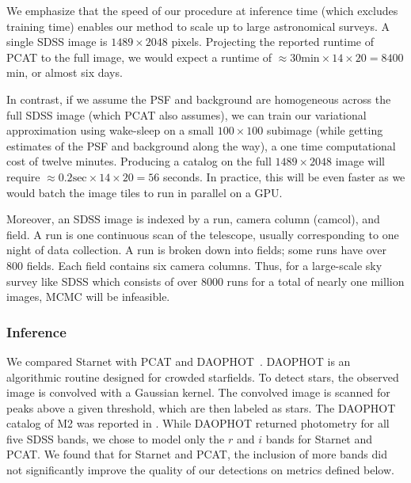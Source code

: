 We emphasize that the speed of our procedure at inference time (which excludes training time) enables our method to scale up to large astronomical surveys. A single SDSS image is $1489 \times 2048$ pixels. Projecting the reported runtime of PCAT to the full image, 
we would expect a runtime of 
$\approx 30\text{min} \times 14 \times 20 = 8400$min, or almost six days. 

In contrast, if we assume the PSF and background are homogeneous 
across the full SDSS image (which PCAT also assumes), we can 
train our variational approximation using wake-sleep 
on a small $100 \times 100$ subimage
(while getting estimates of the PSF and background along the way),
a one time computational cost of twelve minutes. 
Producing a catalog on the full $1489 \times 2048$ image will require 
$\approx 0.2\text{sec} \times 14 \times 20 = 56$ seconds. In practice, 
this will be even faster as we would batch the image tiles to run in parallel on a GPU. 

Moreover, an SDSS image is indexed by a run, camera column (camcol), and field.
A run is one continuous scan of the telescope, usually corresponding to one night of data collection. 
A run is broken down into fields; some runs have over 800 fields. 
Each field contains six camera columns. 
Thus, for a large-scale sky survey like SDSS which 
consists of over 8000 runs for a total of nearly one million images, MCMC will be infeasible. 


\subsubsection{Inference}
\label{sec:m2_results}
We compared Starnet with PCAT and DAOPHOT~\cite{stetson2987daophot}. DAOPHOT is an algorithmic routine designed for crowded starfields. 
To detect stars, the observed image is convolved with a Gaussian kernel. 
The convolved image is scanned for peaks above a given threshold, which are then labeled as stars. The DAOPHOT catalog of M2 was reported in 
\cite{An_2008_m2}. While DAOPHOT returned photometry for all five SDSS bands, 
we chose to model only the $r$ and $i$ bands for Starnet and PCAT. We found that for Starnet and PCAT, the inclusion of more bands did not significantly improve
the quality of our detections on metrics defined below. 

